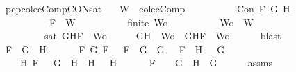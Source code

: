 \begin{isabellebody}
\begin{isamarkuptext}
\end{isamarkuptext}\isamarkuptrue%
\isamarkupfalse%
\ pcp{\isacharunderscore}colecComp{\isacharunderscore}CON{\isacharunderscore}sat{\isacharcolon}\isanewline
\ \ \ {\isachardoublequoteopen}W\ {\isasymin}\ colecComp{\isachardoublequoteclose}\isanewline
\ \ \ \ \ \ \ \ \ \ {\isachardoublequoteopen}Con\ F\ G\ H{\isachardoublequoteclose}\isanewline
\ \ \ \ \ \ \ \ \ \ {\isachardoublequoteopen}F\ {\isasymin}\ W{\isachardoublequoteclose}\isanewline
\ \ \ \ \ \ \ \ \ \ {\isachardoublequoteopen}finite\ Wo{\isachardoublequoteclose}\isanewline
\ \ \ \ \ \ \ \ \ \ {\isachardoublequoteopen}Wo\ {\isasymsubseteq}\ W{\isachardoublequoteclose}\isanewline
\ \ \ \ \ \ \ \ \ {\isachardoublequoteopen}sat\ {\isacharparenleft}{\isacharbraceleft}G{\isacharcomma}H{\isacharcomma}F{\isacharbraceright}\ {\isasymunion}\ Wo{\isacharparenright}{\isachardoublequoteclose}\isanewline
%
\isadelimproof
%
\endisadelimproof
%
\isatagproof
{}\isamarkupfalse%
\ {\isacharminus}\isanewline
\ \ \isamarkupfalse%
\ {\isachardoublequoteopen}{\isacharbraceleft}G{\isacharcomma}H{\isacharbraceright}\ {\isasymunion}\ Wo\ {\isasymsubseteq}\ {\isacharbraceleft}G{\isacharcomma}H{\isacharcomma}F{\isacharbraceright}\ {\isasymunion}\ Wo{\isachardoublequoteclose}\isanewline
\ \ \ \ \isamarkupfalse%
\ blast\isanewline
\ \ \isamarkupfalse%
\ {\isachardoublequoteopen}F\ {\isacharequal}\ G\ \isactrlbold {\isasymand}\ H\ {\isasymor}\ \isanewline
\ \ \ \ {\isacharparenleft}{\isasymexists}F{}\ G{}{\isachardot}\ F\ {\isacharequal}\ \isactrlbold {\isasymnot}\ {\isacharparenleft}F{}\ \isactrlbold {\isasymor}\ G{}{\isacharparenright}\ {\isasymand}\ G\ {\isacharequal}\ \isactrlbold {\isasymnot}\ F{}\ {\isasymand}\ H\ {\isacharequal}\ \isactrlbold {\isasymnot}\ G{}{\isacharparenright}\ {\isasymor}\ \isanewline
\ \ \ \ {\isacharparenleft}{\isasymexists}H{}{\isachardot}\ F\ {\isacharequal}\ \isactrlbold {\isasymnot}\ {\isacharparenleft}G\ \isactrlbold {\isasymrightarrow}\ H{}{\isacharparenright}\ {\isasymand}\ H\ {\isacharequal}\ \isactrlbold {\isasymnot}\ H{}{\isacharparenright}\ {\isasymor}\ \isanewline
\ \ \ \ F\ {\isacharequal}\ \isactrlbold {\isasymnot}\ {\isacharparenleft}\isactrlbold {\isasymnot}\ G{\isacharparenright}\ {\isasymand}\ H\ {\isacharequal}\ G{\isachardoublequoteclose}\isanewline
\ \ \ \ \isamarkupfalse%
\ assms{\isacharparenleft}{}{\isacharparenright}\ \isamarkupfalse%

\end{isabellebody}
